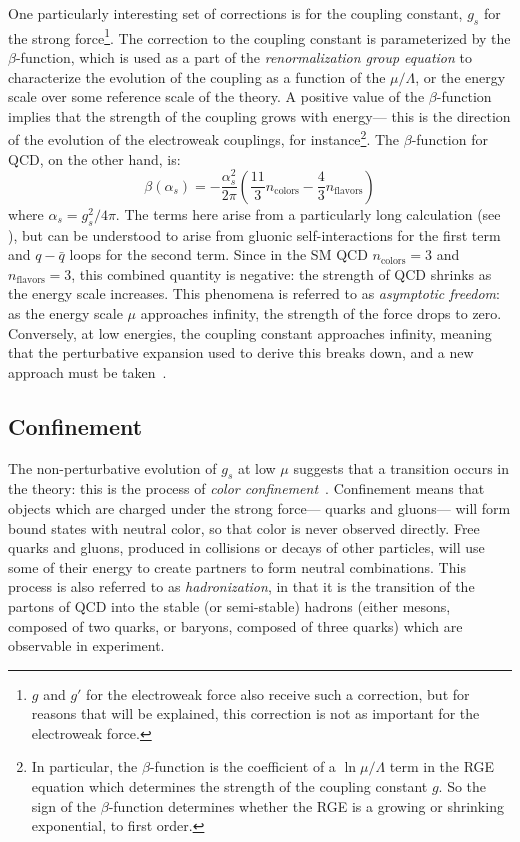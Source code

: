 One particularly interesting set of corrections is for the coupling constant, $g_s$ for the strong force\footnote{$g$ and $g'$ for the electroweak force also receive such a correction, but for reasons that will be explained, this correction is not as important for the electroweak force.}. The correction to the coupling constant is parameterized by the $\beta$-function, which is used as a part of the \textit{renormalization group equation} to characterize the evolution of the coupling as a function of the $\mu/\Lambda$, or the energy scale over some reference scale of the theory. A positive value of the $\beta$-function implies that the strength of the coupling grows with energy--- this is the direction of the evolution of the electroweak couplings, for instance\footnote{In particular, the $\beta$-function is the coefficient of a $\ln{\mu/\Lambda}$ term in the RGE equation which determines the strength of the coupling constant $g$. So the sign of the $\beta$-function determines whether the RGE is a growing or shrinking exponential, to first order.}. The $\beta$-function for QCD, on the other hand, is:
%
\begin{equation}
\beta(\alpha_s) = - \frac{\alpha_s^2}{2\pi} \left(\frac{11}{3} n_\mathrm{colors} - \frac{4}{3}n_\mathrm{flavors}\right)
\end{equation} 
%
where $\alpha_s = g_s^2 / 4\pi$. The terms here arise from a particularly long calculation (see \cite{schwartz}), but can be understood to arise from gluonic self-interactions for the first term and $q-\bar{q}$ loops for the second term. Since in the SM QCD $n_\mathrm{colors} = 3$ and $n_\mathrm{flavors} = 3$, this combined quantity is negative: the strength of QCD shrinks as the energy scale increases. This phenomena is referred to as \textit{asymptotic freedom}: as the energy scale $\mu$ approaches infinity, the strength of the force drops to zero. Conversely, at low energies, the coupling constant approaches infinity, meaning that the perturbative expansion used to derive this breaks down, and a new approach must be taken~\cite{Gross:1973ju,Gross:1973id}.

\subsection{Confinement}
\label{chapter:sm:qcd:confinement}

The non-perturbative evolution of $g_s$ at low $\mu$ suggests that a transition occurs in the theory: this is the process of \textit{color confinement}~\cite{Wilson:1974sk}. Confinement means that objects which are charged under the strong force--- quarks and gluons--- will form bound states with neutral color, so that color is never observed directly. Free quarks and gluons, produced in collisions or decays of other particles, will use some of their energy to create partners to form neutral combinations. This process is also referred to as \textit{hadronization}, in that it is the transition of the partons of QCD into the stable (or semi-stable) hadrons (either mesons, composed of two quarks, or baryons, composed of three quarks) which are observable in experiment. 

